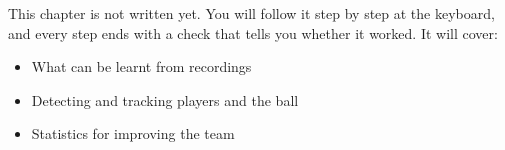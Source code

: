 \label{k:video}
\begin{keyidea}
This chapter is not written yet. You will follow it step by step at the keyboard, and every step ends with a check that tells you whether it worked. It will cover:
\begin{itemize}[nosep]
  \item What can be learnt from recordings
  \item Detecting and tracking players and the ball
  \item Statistics for improving the team
\end{itemize}
\end{keyidea}
